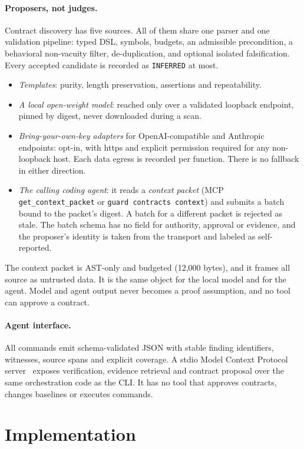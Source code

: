 \documentclass[10pt,twocolumn]{article}
\newcommand{\res}[1]{\texttt{\small #1}}
\begin{document}
\paragraph{Proposers, not judges.}
Contract discovery has five sources. All of them share one parser and one validation pipeline: typed DSL, symbols,
budgets, an admissible precondition, a behavioral non-vacuity filter, de-duplication, and optional isolated
falsification. Every accepted candidate is recorded as \res{INFERRED} at most.
\begin{itemize}
\item \emph{Templates}: purity, length preservation, assertions and repeatability.
\item \emph{A local open-weight model}: reached only over a validated loopback endpoint, pinned by digest, never
  downloaded during a scan.
\item \emph{Bring-your-own-key adapters} for OpenAI-compatible and Anthropic endpoints: opt-in, with https and explicit
  permission required for any non-loopback host. Each data egress is recorded per function. There is no fallback in
  either direction.
\item \emph{The calling coding agent}: it reads a \emph{context packet} (MCP \texttt{get\_context\_packet} or
  \texttt{guard contracts context}) and submits a batch bound to the packet's digest. A batch for a different packet is
  rejected as stale. The batch schema has no field for authority, approval or evidence, and the proposer's identity is
  taken from the transport and labeled as self-reported.
\end{itemize}
The context packet is AST-only and budgeted (12{,}000 bytes), and it frames all source as untrusted data. It is the same
object for the local model and for the agent. Model and agent output never becomes a proof assumption, and no tool can
approve a contract.

\paragraph{Agent interface.}
All commands emit schema-validated JSON with stable finding identifiers, witnesses, source spans and explicit coverage.
A stdio Model Context Protocol server~\cite{mcp2025transports,mcp_python_sdk} exposes verification, evidence retrieval
and contract proposal over the same orchestration code as the CLI. It has no tool that approves contracts, changes
baselines or executes commands.

\section{Implementation}
\label{sec:impl}
\end{document}
